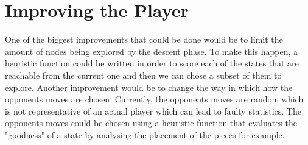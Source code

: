 \documentclass[12pt]{article} %
\begin{document}
\section{Improving the Player}
One of the biggest improvements that could be done would be to limit the amount of nodes being explored by the descent phase. To make this happen, a heuristic function could be written in order 
to score each of the states that are reachable from the current one and then we can chose a subset of them to explore. Another improvement would be to change the way in which 
how the opponents moves are chosen. Currently, the opponents moves are random which is not representative of an actual player which can lead to faulty statistics. The opponents 
moves could be chosen using a heuristic function that evaluates the "goodness" of a state by analysing the placement of the pieces for example.\\
\end{document}

